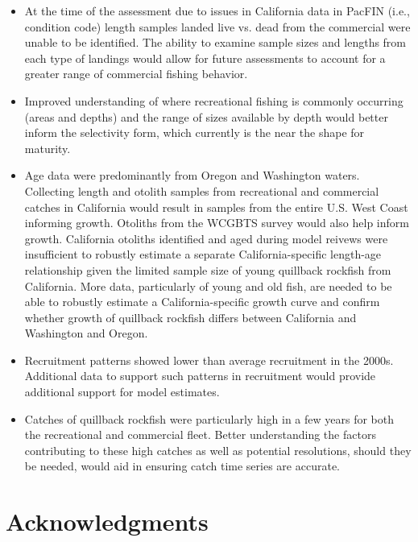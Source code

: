 \documentclass[11pt,
  english,
  a4paper,
]{article}
\begin{document}
\begin{itemize}

  \item At the time of the assessment due to issues in California data in PacFIN (i.e., condition code) length samples landed live vs. dead from the commercial were unable to be identified. The ability to examine sample sizes and lengths from each type of landings would allow for future assessments to account for a greater range of commercial fishing behavior.
  
  \item Improved understanding of where recreational fishing is commonly occurring (areas and depths) and the range of sizes available by depth would better inform the selectivity form, which currently is the near the shape for maturity.  

    \item Age data were predominantly from Oregon and Washington waters. Collecting length and otolith samples from recreational and commercial catches in California would result in samples from the entire U.S. West Coast informing growth. Otoliths from the WCGBTS survey would also help inform growth. California otoliths identified and aged during model reivews were insufficient to robustly estimate a separate California-specific length-age relationship given the limited sample size of young quillback rockfish from California. More data, particularly of young and old fish, are needed to be able to robustly estimate a California-specific growth curve and confirm whether growth of quillback rockfish differs between California and Washington and Oregon. 
    
    \item Recruitment patterns showed lower than average recruitment in the 2000s. Additional data to support such patterns in recruitment would provide additional support for model estimates. 
    
    \item Catches of quillback rockfish were particularly high in a few years for both the recreational and commercial fleet. Better understanding the factors contributing to these high catches as well as potential resolutions, should they be needed, would aid in ensuring catch time series are accurate.  
    
\end{itemize}


\hypertarget{acknowledgments}{%
\section{Acknowledgments}\label{acknowledgments}}
\end{document}
